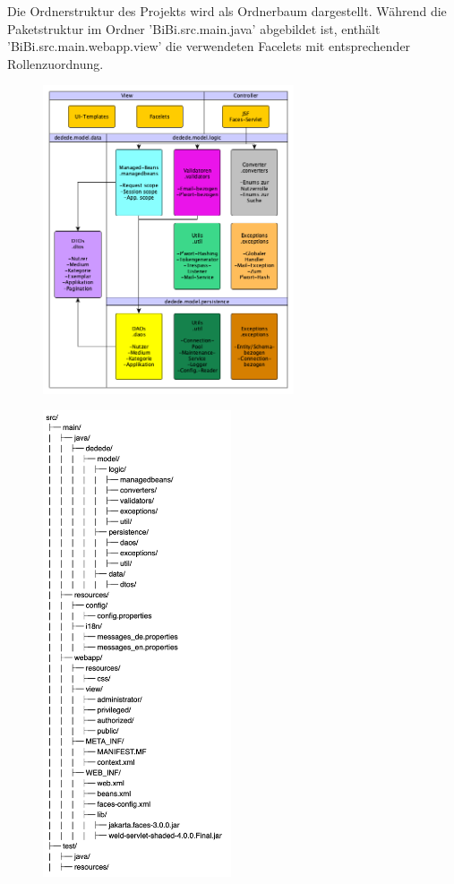 \documentclass{article}
\begin{document}
Die Ordnerstruktur des Projekts wird als Ordnerbaum dargestellt. 
Während die Paketstruktur im Ordner 'BiBi.src.main.java' abgebildet ist, enthält 'BiBi.src.main.webapp.view' die verwendeten Facelets mit entsprechender Rollenzuordnung. \vspace{0.5em}

\begin{figure}[h]

\end{figure}

\begin{figure}[h]
	\centering
	\includegraphics[width = 20em]{Modeldiagramm}
\end{figure}
\begin{figure}[h]
	\centering
	\includegraphics[width = 15em]{FileStructure}
\end{figure}
\end{document}
